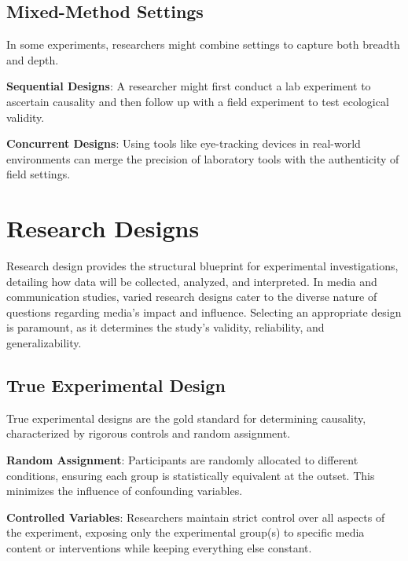 \documentclass[
  b5paper]{book}
\begin{document}
\hypertarget{mixed-method-settings}{%
\subsection*{Mixed-Method Settings}\label{mixed-method-settings}}

In some experiments, researchers might combine settings to capture both breadth and depth.

\textbf{Sequential Designs}: A researcher might first conduct a lab experiment to ascertain causality and then follow up with a field experiment to test ecological validity.

\textbf{Concurrent Designs}: Using tools like eye-tracking devices in real-world environments can merge the precision of laboratory tools with the authenticity of field settings.

\hypertarget{research-designs}{%
\section{Research Designs}\label{research-designs}}

Research design provides the structural blueprint for experimental investigations, detailing how data will be collected, analyzed, and interpreted. In media and communication studies, varied research designs cater to the diverse nature of questions regarding media's impact and influence. Selecting an appropriate design is paramount, as it determines the study's validity, reliability, and generalizability.

\hypertarget{true-experimental-design}{%
\subsection*{True Experimental Design}\label{true-experimental-design}}

True experimental designs are the gold standard for determining causality, characterized by rigorous controls and random assignment.

\textbf{Random Assignment}: Participants are randomly allocated to different conditions, ensuring each group is statistically equivalent at the outset. This minimizes the influence of confounding variables.

\textbf{Controlled Variables}: Researchers maintain strict control over all aspects of the experiment, exposing only the experimental group(s) to specific media content or interventions while keeping everything else constant.
\end{document}
